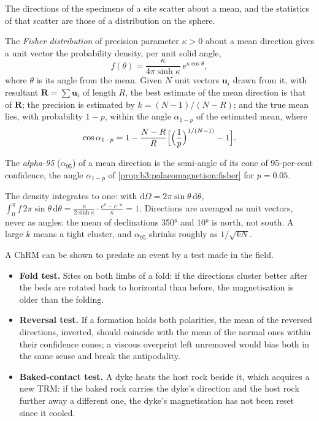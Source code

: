 The directions of the specimens of a site scatter about a mean, and the
statistics of that scatter are those of a distribution on the sphere.

\begin{proposition}\label{prop:b3:palaeomagnetism:fisher}
The \emph{Fisher distribution} of precision
parameter $\kappa > 0$ about a mean direction gives a unit vector the
probability density, per unit solid angle,
\[
  f(\theta) = \frac{\kappa}{4\pi\sinh\kappa}\,e^{\kappa\cos\theta},
\]
where $\theta$ is its angle from the mean. Given $N$ unit vectors $\mathbf u_i$
drawn from it, with resultant $\mathbf R = \sum\mathbf u_i$ of length $R$, the
best estimate of the mean direction is that of $\mathbf R$; the precision is
estimated by $k = (N - 1)/(N - R)$; and the true mean lies, with probability
$1 - p$, within the angle $\alpha_{1-p}$ of the estimated mean, where
\[
  \cos\alpha_{1-p} = 1 - \frac{N - R}{R}\Bigl[\Bigl(\frac1p\Bigr)^{1/(N-1)} - 1\Bigr].
\]
\end{proposition}
\admitted

\begin{definition}[Alpha-95]\label{def:b3:palaeomagnetism:a95}
The \emph{alpha-95} ($\alpha_{95}$) of a mean direction is the
semi-angle of its cone of 95-per-cent confidence, the angle $\alpha_{1-p}$ of
\cref{prop:b3:palaeomagnetism:fisher} for $p = 0.05$.
\end{definition}

The density integrates to one: with $\mathrm d\Omega = 2\pi\sin\theta\,\mathrm
d\theta$, $\int_0^\pi f\,2\pi\sin\theta\,\mathrm d\theta =
\frac{\kappa}{2\sinh\kappa}\cdot\frac{e^\kappa - e^{-\kappa}}{\kappa} = 1$. Directions are averaged as unit
vectors, never as angles: the mean of declinations \ang{350} and \ang{10} is
north, not south. A large $k$ means a tight cluster, and $\alpha_{95}$ shrinks
roughly as $1/\sqrt{kN}$.

\begin{method}\label{met:b3:palaeomagnetism:tests}
A ChRM can be shown to predate an event by a test made in the field.
\begin{itemize}
  \item \textbf{Fold test.} Sites on both limbs of a fold: if the directions
        cluster better after the beds are rotated back to horizontal than
        before, the magnetisation is older than the folding.
  \item \textbf{Reversal test.} If a formation holds both polarities, the mean
        of the reversed directions, inverted, should coincide with the mean of
        the normal ones within their confidence cones; a viscous overprint left
        unremoved would bias both in the same sense and break the antipodality.
  \item \textbf{Baked-contact test.} A dyke heats the host rock beside it,
        which acquires a new TRM: if the baked rock carries the dyke's direction
        and the host rock further away a different one, the dyke's magnetisation
        has not been reset since it cooled.
\end{itemize}
\end{method}

